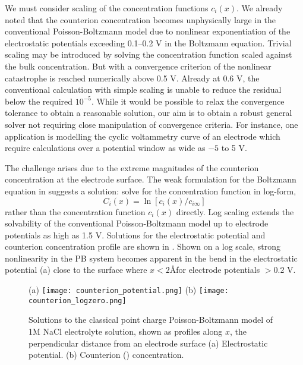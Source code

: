 We must consider scaling of the concentration functions $c_i(x)$. We
already noted that the counterion concentration becomes unphysically
large in the conventional Poisson-Boltzmann model due to nonlinear
exponentiation of the electrostatic potentials exceeding 0.1--0.2 V in
the Boltzmann equation. Trivial scaling may be introduced by solving
the concentration function scaled against the bulk concentration. But
with a convergence criterion of the nonlinear catastrophe is reached
numerically above 0.5 V. Already at 0.6 V, the conventional
calculation with simple scaling is unable to reduce the residual below
the required $10^{-5}$. While it would be possible to relax the
convergence tolerance to obtain a reasonable solution, our aim is to
obtain a robust general solver not requiring close manipulation of
convergence criteria. For instance, one application is modelling the
cyclic voltammetry curve of an electrode which require calculations
over a potential window as wide as $-5$ to 5 V.

The challenge arises due to the extreme magnitudes of the counterion
concentration at the electrode surface. The weak formulation for the
Boltzmann equation in  suggests a solution:
solve for the concentration function in log-form,
\begin{equation}
C_{i}(x) = \ln[ c_{i}(x) / c_{i\infty}]
\label{log_scaling}
\end{equation}
rather than the concentration function $c_{i}(x)$ directly. Log
scaling extends the solvability of the conventional Poisson-Boltzmann
model up to electrode potentials as high as 1.5 V. Solutions for the
electrostatic potential and counterion concentration profile are shown
in . Shown on a log scale, strong
nonlinearity in the PB system becomes apparent in the bend in the
electrostatic potential (a) close to the
surface where $x<2$\AA for electrode potentials $> 0.2$ V.


\begin{figure}
\centering
(a)
\texttt{[image: counterion\_potential.png]}
(b)
\texttt{[image: counterion\_logzero.png]}
\caption{\label{fig_classical_PB}Solutions to the classical point
  charge Poisson-Boltzmann model of 1M NaCl electrolyte solution,
  shown as profiles along $x$, the perpendicular distance from an
  electrode surface (a) Electrostatic potential. (b) Counterion
  () concentration. }
\end{figure}

